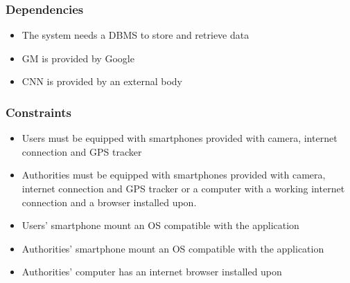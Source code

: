 \subsubsection{Dependencies}

\begin{itemize}

\item The system needs a DBMS to store and retrieve data

\item GM is provided by Google

\item CNN is provided by an external body

\end{itemize}

\subsubsection{Constraints}

\begin{itemize}

\item Users must be equipped with smartphones provided with camera, internet connection and GPS tracker

\item Authorities must be equipped with smartphones provided with camera, internet connection and GPS tracker or a computer with a working internet connection and a browser installed upon.

\item Users' smartphone mount an OS compatible with the application

\item Authorities' smartphone mount an OS compatible with the application

\item Authorities' computer has an internet browser installed upon

\end{itemize}